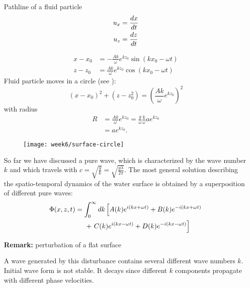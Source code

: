 Pathline of a fluid particle
\begin{align}
u_x &= \frac{d x}{d t}\\
u_z &= \frac{d z}{d t}
\end{align}

\begin{align}
x-x_0 &= -\frac{Ak}{\omega}e^{kz_0}\sin(kx_0-\omega t)\\
z-z_0 &= \frac{Ak}{\omega}e^{kz_0}\cos(kx_0-\omega t)
\end{align}
Fluid particle moves in a circle (see ):
\begin{equation}
(x-x_0)^2+(z-z_0^2)=\left(\frac{Ak}{\omega}e^{kz_0}\right)^2
\end{equation}
with radius
\begin{align}
R &= \frac{Ak}{\omega}e^{kz_0}=\frac{g}{\omega}\frac{k}{\omega}ae^{kz_0}\\
&= ae^{kz_0}.
\end{align}

\begin{figure}[!h]
    \centering
    \texttt{[image: week6/surface-circle]}\\
    \caption{}
    \label{fig:surface-circle}
\end{figure}

So far we have discussed a pure wave, which is characterized by the wave number $k$ and which travels with $c=\sqrt{\frac{g}{k}}=\sqrt{\frac{g\lambda}{2\pi}}$. The most general solution describing the spatio-temporal dynamics of the water surface is obtained by a superposition of different pure waves:
\begin{align}
\begin{split}
\Phi(x,z,t) &= \int_0^\infty dk\left[A(k)e^{i(kx+\omega t)}+B(k)e^{-i(kx+\omega t)}\right. \\
&\hspace{5mm}+\left.C(k)e^{i(kx-\omega t)}+D(k)e^{-i(kx-\omega t)}\right]
\end{split}
\end{align}

\begin{framed}
\textbf{Remark:} perturbation of a flat surface

A wave generated by this disturbance contains several different wave numbers $k$. Initial wave form is not stable. It decays since different $k$ components propagate with different phase velocities.
\end{framed}

